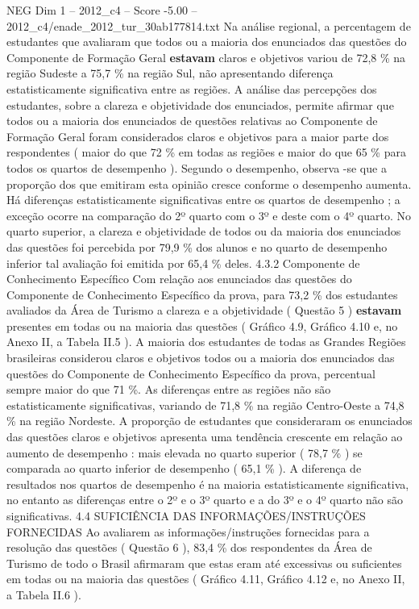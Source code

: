 \begin{textsample}{NEG Dim 1 – 2012\_c4 – Score -5.00 – 2012\_c4/enade\_2012\_tur\_30ab177814.txt}
Na análise regional, a percentagem de estudantes que avaliaram que todos ou a maioria dos enunciados das questões do Componente de Formação Geral \textbf{estavam} claros e objetivos variou de 72,8 \% na região Sudeste a 75,7 \% na região Sul, não apresentando diferença estatisticamente significativa entre as regiões.
A análise das percepções dos estudantes, sobre a clareza e objetividade dos enunciados, permite afirmar que todos ou a maioria dos enunciados de questões relativas ao Componente de Formação Geral foram considerados claros e objetivos para a maior parte dos respondentes ( maior do que 72 \% em todas as regiões e maior do que 65 \% para todos os quartos de desempenho ).
Segundo o desempenho, observa -se que a proporção dos que emitiram esta opinião cresce conforme o desempenho aumenta.
Há diferenças estatisticamente significativas entre os quartos de desempenho ; a exceção ocorre na comparação do 2º quarto com o 3º e deste com o 4º quarto.
No quarto superior, a clareza e objetividade de todos ou da maioria dos enunciados das questões foi percebida por 79,9 \% dos alunos e no quarto de desempenho inferior tal avaliação foi emitida por 65,4 \% deles. 4.3.2 Componente de Conhecimento Específico Com relação aos enunciados das questões do Componente de Conhecimento Específico da prova, para 73,2 \% dos estudantes avaliados da Área de Turismo a clareza e a objetividade ( Questão 5 ) \textbf{estavam} presentes em todas ou na maioria das questões ( Gráfico 4.9, Gráfico 4.10 e, no Anexo II, a Tabela II.5 ).
A maioria dos estudantes de todas as Grandes Regiões brasileiras considerou claros e objetivos todos ou a maioria dos enunciados das questões do Componente de Conhecimento Específico da prova, percentual sempre maior do que 71 \%.
As diferenças entre as regiões não são estatisticamente significativas, variando de 71,8 \% na região Centro-Oeste a 74,8 \% na região Nordeste.
A proporção de estudantes que consideraram os enunciados das questões claros e objetivos apresenta uma tendência crescente em relação ao aumento de desempenho : mais elevada no quarto superior ( 78,7 \% ) se comparada ao quarto inferior de desempenho ( 65,1 \% ).
A diferença de resultados nos quartos de desempenho é na maioria estatisticamente significativa, no entanto as diferenças entre o 2º e o 3º quarto e a do 3º e o 4º quarto não são significativas. 4.4 SUFICIÊNCIA DAS INFORMAÇÕES/INSTRUÇÕES FORNECIDAS Ao avaliarem as informações/instruções fornecidas para a resolução das questões ( Questão 6 ), 83,4 \% dos respondentes da Área de Turismo de todo o Brasil afirmaram que estas eram até excessivas ou suficientes em todas ou na maioria das questões ( Gráfico 4.11, Gráfico 4.12 e, no Anexo II, a Tabela II.6 ).

\end{textsample}
